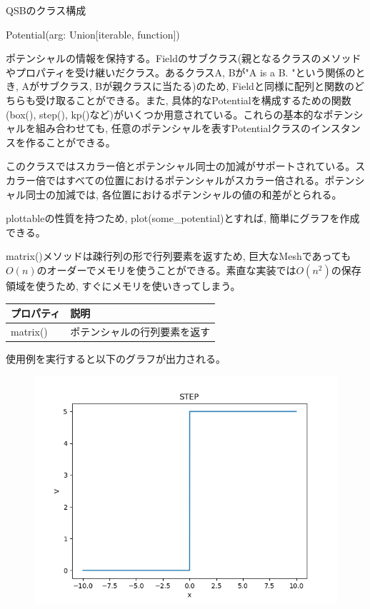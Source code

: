 \documentclass[a4paper, lualatex]{bxjsarticle}
\begin{document}
\begin{section}{QSBのクラス構成\label{AppQ}}
    \begin{subsection}{Potential(arg: Union[iterable, function])}
        \par ポテンシャルの情報を保持する。Fieldのサブクラス(親となるクラスのメソッドやプロパティを受け継いだクラス。あるクラスA, Bが"A is a B. "という関係のとき, Aがサブクラス, Bが親クラスに当たる)のため, Fieldと同様に配列と関数のどちらも受け取ることができる。また, 具体的なPotentialを構成するための関数(box(), step(), kp()など)がいくつか用意されている。これらの基本的なポテンシャルを組み合わせても, 任意のポテンシャルを表すPotentialクラスのインスタンスを作ることができる。
        \par このクラスではスカラー倍とポテンシャル同士の加減がサポートされている。スカラー倍ではすべての位置におけるポテンシャルがスカラー倍される。ポテンシャル同士の加減では, 各位置におけるポテンシャルの値の和差がとられる。
        \par plottableの性質を持つため, plot(some\_potential)とすれば, 簡単にグラフを作成できる。
        \par matrix()メソッドは疎行列の形で行列要素を返すため, 巨大なMeshであっても$O(n)$のオーダーでメモリを使うことができる。素直な実装では$O(n^2)$の保存領域を使うため, すぐにメモリを使いきってしまう。
        \begin{table}[h]
            \begin{tabular}{ll}
                プロパティ & 説明\\ \hline
                matrix() & ポテンシャルの行列要素を返す\\
            \end{tabular}
        \end{table}
        
        使用例を実行すると以下のグラフが出力される。
        \begin{figure}[h]
            \begin{minipage}{0.5\hsize}
                \centering
                \includegraphics[width=0.9\hsize]{STEP.png}

\end{minipage}
\end{figure}
\end{subsection}
\end{section}
\end{document}
